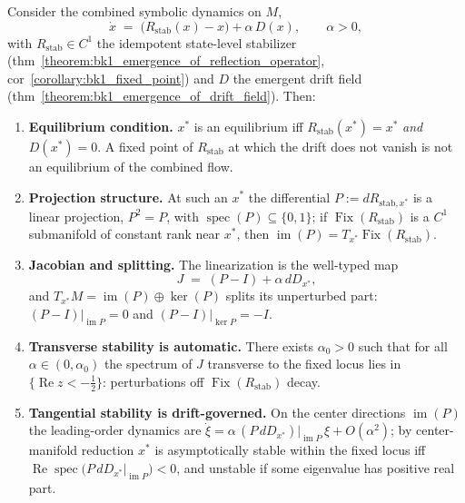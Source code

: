 \begin{lemma}
\label{lemma:bk1_local_stability_analysis}
Consider the combined symbolic dynamics on $M$,
\[
\dot{x} \;=\; \bigl(R_{\mathrm{stab}}(x) - x\bigr) + \alpha\,D(x), \qquad \alpha > 0,
\]
with $R_{\mathrm{stab}} \in C^1$ the idempotent state-level stabilizer (thm~\ref{theorem:bk1_emergence_of_reflection_operator}, cor~\ref{corollary:bk1_fixed_point}) and $D$ the emergent drift field (thm~\ref{theorem:bk1_emergence_of_drift_field}). Then:
\begin{enumerate}
    \item \textbf{Equilibrium condition.} $x^*$ is an equilibrium iff $R_{\mathrm{stab}}(x^*) = x^*$ \emph{and} $D(x^*) = 0$. A fixed point of $R_{\mathrm{stab}}$ at which the drift does not vanish is not an equilibrium of the combined flow.
    \item \textbf{Projection structure.} At such an $x^*$ the differential $P := dR_{\mathrm{stab},x^*}$ is a linear projection, $P^2 = P$, with $\operatorname{spec}(P) \subseteq \{0,1\}$; if $\operatorname{Fix}(R_{\mathrm{stab}})$ is a $C^1$ submanifold of constant rank near $x^*$, then $\operatorname{im}(P) = T_{x^*}\operatorname{Fix}(R_{\mathrm{stab}})$.
    \item \textbf{Jacobian and splitting.} The linearization is the well-typed map
    \[
    J \;=\; (P - I) + \alpha\,dD_{x^*},
    \]
    and $T_{x^*}M = \operatorname{im}(P) \oplus \ker(P)$ splits its unperturbed part: $(P-I)|_{\operatorname{im} P} = 0$ and $(P-I)|_{\ker P} = -I$.
    \item \textbf{Transverse stability is automatic.} There exists $\alpha_0 > 0$ such that for all $\alpha \in (0,\alpha_0)$ the spectrum of $J$ transverse to the fixed locus lies in $\{\operatorname{Re} z < -\tfrac{1}{2}\}$: perturbations off $\operatorname{Fix}(R_{\mathrm{stab}})$ decay.
    \item \textbf{Tangential stability is drift-governed.} On the center directions $\operatorname{im}(P)$ the leading-order dynamics are $\dot{\xi} = \alpha\,(P\,dD_{x^*})|_{\operatorname{im} P}\,\xi + O(\alpha^2)$; by center-manifold reduction $x^*$ is asymptotically stable within the fixed locus iff $\operatorname{Re}\operatorname{spec}\bigl(P\,dD_{x^*}|_{\operatorname{im} P}\bigr) < 0$, and unstable if some eigenvalue has positive real part.
\end{enumerate}
\end{lemma}

